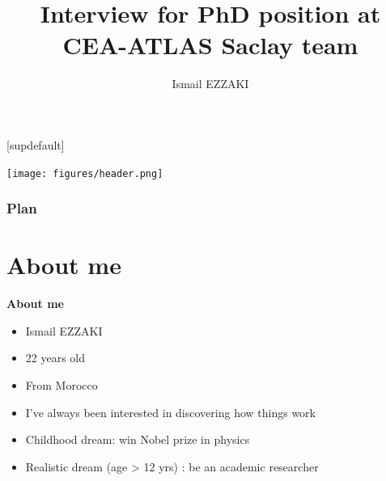 \documentclass[11pt,aspectratio=169]{beamer}
\title[ \hspace{0.8cm} \insertframenumber/\inserttotalframenumber]{{\sc Interview for PhD position at CEA-ATLAS Saclay team }}
\author{{ Ismail EZZAKI}}
\begin{document}
	
	[supdefault]

{
  \begin{frame}
   \begin{center}	\texttt{[image: figures/header.png]}\\
  \end{center}
  
    \titlepage
  \end{frame}
}
\begin{frame}

  \frametitle{Plan
  }
	\tableofcontents
\end{frame}





\section{About me}
 
\begin{frame}{\underline{\secname}}
	
\begin{center}
\textbf{About me}
\end{center}

\begin{itemize}
	\item Ismail EZZAKI
	\item 22 years old
	\item From Morocco
	\item I’ve always been interested in discovering how things work
	\item Childhood dream: win Nobel prize in physics
	\item Realistic dream (age > 12 yrs) : be an academic researcher
\end{itemize}	


\end{frame}
\end{document}
